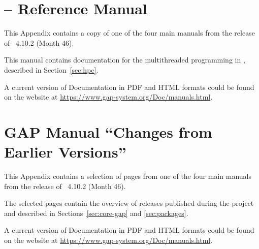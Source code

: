 \documentclass{deliverablereport}
\author{Author names}
\begin{document}
\maketitle
\githubissuedescription

\newpage
\tableofcontents















\clearpage
\appendix

\section{\HPCGAP -- Reference Manual}\label{sec:hpc-manual}

This Appendix contains a copy of 
one of the four main \GAP manuals
from the release of \GAP~4.10.2 (Month 46).

This manual contains documentation for the multithreaded programming
in \GAP, described in Section~\ref{sec:hpc}.

A current version of \GAP Documentation in PDF and HTML formats
could be found on the \GAP website at \url{https://www.gap-system.org/Doc/manuals.html}.

%

\section{GAP Manual ``Changes from Earlier Versions''}\label{sec:changes-manual}

This Appendix contains a selection of pages from
one of the four main \GAP manuals
from the release of \GAP~4.10.2 (Month 46).

The selected pages contain the overview of \GAP releases published
during the project and described in Sections~\ref{sec:core-gap} and \ref{sec:packages}.

A current version of \GAP Documentation in PDF and HTML formats
could be found on the \GAP website at \url{https://www.gap-system.org/Doc/manuals.html}.

%



\clearpage
{}
\printbibliography
\end{document}
